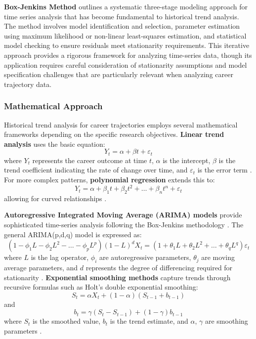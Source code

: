 \documentclass[../main.tex]{subfiles}
\begin{document}

\textbf{Box-Jenkins Method} \citep{wikipedia2005} outlines a systematic three-stage modeling approach for time series analysis that has become fundamental to historical trend analysis. The method involves model identification and selection, parameter estimation using maximum likelihood or non-linear least-squares estimation, and statistical model checking to ensure residuals meet stationarity requirements. This iterative approach provides a rigorous framework for analyzing time-series data, though its application requires careful consideration of stationarity assumptions and model specification challenges that are particularly relevant when analyzing career trajectory data.

\subsubsection{Mathematical Approach}

Historical trend analysis for career trajectories employs several mathematical frameworks depending on the specific research objectives. \textbf{Linear trend analysis} uses the basic equation: 
\[Y_t = \alpha + \beta t + \varepsilon_t\]
where \(Y_t\) represents the career outcome at time \(t\), \(\alpha\) is the intercept, \(\beta\) is the trend coefficient indicating the rate of change over time, and \(\varepsilon_t\) is the error term \citep{quantilope2023}. For more complex patterns, \textbf{polynomial regression} extends this to: 
\[Y_t = \alpha + \beta_1 t + \beta_2 t^2 + \ldots + \beta_n t^n + \varepsilon_t\]
allowing for curved relationships \citep{quantilope2023}.

\textbf{Autoregressive Integrated Moving Average (ARIMA) models} provide sophisticated time-series analysis following the Box-Jenkins methodology \citep{wikipedia2005}. The general ARIMA(p,d,q) model is expressed as: 
\[(1-\phi_1 L-\phi_2 L^2-\ldots-\phi_p L^p)(1-L)^d X_t = (1+\theta_1 L+\theta_2 L^2+\ldots+\theta_q L^q)\varepsilon_t\]
where \(L\) is the lag operator, \(\phi_i\) are autoregressive parameters, \(\theta_j\) are moving average parameters, and \(d\) represents the degree of differencing required for stationarity \citep{wikipedia2005}. \textbf{Exponential smoothing methods} capture trends through recursive formulas such as Holt's double exponential smoothing: 
\[S_t = \alpha X_t + (1-\alpha)(S_{t-1} + b_{t-1})\]
and 
\[b_t = \gamma(S_t - S_{t-1}) + (1-\gamma)b_{t-1}\]
where \(S_t\) is the smoothed value, \(b_t\) is the trend estimate, and \(\alpha\), \(\gamma\) are smoothing parameters \citep{quantilope2023}.
\end{document}

